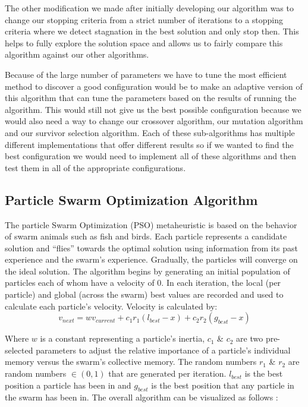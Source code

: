 \documentclass[a4paper]{article}
\begin{document}
The other modification we made after initially developing our algorithm was to change our stopping criteria from a strict number of iterations to a stopping criteria where we detect stagnation in the best solution and only stop then. This helps to fully explore the solution space and allows us to fairly compare this algorithm against our other algorithms.

Because of the large number of parameters we have to tune the most efficient method to discover a good configuration would be to make an adaptive version of this algorithm that can tune the parameters based on the results of running the algorithm. This would still not give us the best possible configuration because we would also need a way to change our crossover algorithm, our mutation algorithm and our survivor selection algorithm. Each of these sub-algorithms has multiple different implementations that offer different results so if we wanted to find the best configuration we would need to implement all of these algorithms and then test them in all of the appropriate configurations.

\subsection{Particle Swarm Optimization Algorithm} %
The particle Swarm Optimization (PSO) metaheuristic is based on the behavior of swarm animals such as fish and birds.
Each particle represents a candidate solution and ``flies'' towards the optimal solution using information from its
past experience and the swarm's experience. Gradually, the particles will converge on the ideal solution.
The algorithm begins by generating an initial population of particles each of whom have a velocity of 0.
In each iteration, the local (per particle) and global (across the swarm) best values are recorded and used to calculate each particle's velocity. \cite{ClassicalPSO}
Velocity is calculated by:
$$
v_\mathit{next} = wv_\mathit{current} + c_1r_1(l_\mathit{best} - x) + c_2r_2(g_\mathit{best}-x)
$$

Where $w$ is a constant representing a particle's inertia, $c_1$ \& $c_2$ are two pre-selected parameters to adjust the relative importance of a particle's individual memory versus the swarm's collective memory. The random numbers $r_1$ \& $r_2$ are random numbers $\in (0,1)$ that are generated per iteration. $l_\mathit{best}$ is the best position a particle has been in and $g_\mathit{best}$ is the best position that any particle in the swarm has
been in. The overall algorithm can be visualized as follows \cite{PSOFigure}:
\end{document}
